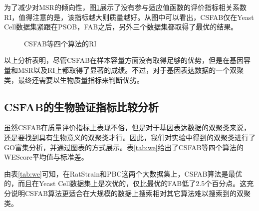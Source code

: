     为了减少对MSR的倾向性，图\ref{fig:ri}展示了没有参与适应值函数的评价指标相关系数RI，值得注意的是，该指标越大则质量越好。从图中可以看出，CSFAB仅在Yeast Cell数据集紧跟在PSOB，FAB之后，另外三个数据集都取得了最优的结果。

    \begin{figure}[htbp]
    \setlength{\subfigcapskip}{-1bp}
    \centering
    \begin{minipage}{.8\textwidth}
    \centering
    \subfigure{\label{fig:ri_bcll}}\addtocounter{subfigure}{-2}
    \hspace{.2em}
    \subfigure{\label{fig:ri_yc}}\addtocounter{subfigure}{-2}
    \end{minipage}
    \centering
    \begin{minipage}{.8\textwidth}
    \centering
    \hspace{.2em}
    \subfigure{\label{fig:ri_pbc}}\addtocounter{subfigure}{-2}
    \hspace{.2em}
    \subfigure{\label{fig:ri_rat}}\addtocounter{subfigure}{-2}
    \end{minipage}
    \vspace{0.2em}
    \caption{CSFAB等四个算法的RI}
    \label{fig:ri}
    \end{figure}

    以上分析表明，尽管CSFAB在样本容量方面没有取得足够的优势，但是在基因容量和MSR以及RI上都取得了显著的成绩。不过，对于基因表达数据的一个双聚类，最终还需要以生物质量指标来判断优劣。

    \subsection{CSFAB的生物验证指标比较分析}
    虽然CSFAB在质量评价指标上表现不俗，但是对于基因表达数据的双聚类来说，还是要找到具有生物意义的双聚类才行。因此，我们对实验中得到的双聚类进行了GO富集分析，并通过图表的方式展示。表\ref{tab:we}给出了CSFAB等四个算法的WEScore平均值与标准差。

    由表\ref{tab:we}可知，在RatStrain和PBC这两个大数据集上，CSFAB算法是最优的，而且在Yeast Cell数据集上是次优的，仅比最优的FAB低了2.5个百分点。这充分说明CSFAB算法更适合在大规模的数据上搜索相对其它算法难以搜索到的双聚类。

